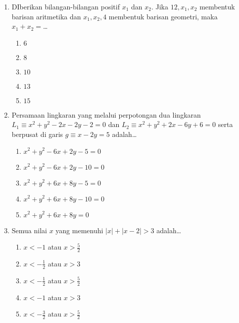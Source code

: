 \documentclass[A4,12PT, english, twocolumn]{journal}
\begin{document}
\begin{enumerate}
\item DIberikan bilangan-bilangan positif $x_1$ dan $x_2$. Jika $12, x_1, x_2$ membentuk barisan aritmetika dan $x_1, x_2, 4$ membentuk barisan geometri, maka $x_1 + x_2 =$\dots
	\begin{enumerate}
       \item $6$  
       \item $8$   
       \item $10$  
       \item $13$  
       \item $15$
	\end{enumerate}

\item Persamaan lingkaran yang melalui perpotongan dua lingkaran $L_1 \equiv x^2+y^2 - 2x - 2y - 2 = 0$ dan $L_2 \equiv x^2+y^2 + 2x - 6y +6 = 0$ serta berpusat di garis $g \equiv x - 2y = 5$ adalah\dots
	\begin{enumerate}
       \item $x^2 + y^2 - 6x + 2y - 5 = 0$
       \item $x^2 + y^2 - 6x + 2y - 10 = 0$ 
       \item $x^2 + y^2 + 6x + 8y - 5 = 0$
       \item $x^2 + y^2 + 6x + 8y - 10 = 0$ 
       \item $x^2 + y^2 + 6x + 8y  = 0$
	\end{enumerate}

\item Semua nilai $x$ yang memenuhi $|x|+|x-2| > 3$ adalah\dots
	\begin{enumerate}
       \item $x < -1$ atau $x > \frac{5}{2}$
       \item $x < -\frac{1}{2}$ atau $x > 3$
       \item $x < -\frac{1}{2}$ atau $x > \frac{5}{2}$
       \item $x < -1$ atau $ x > 3$
       \item $x < -\frac{3}{2}$ atau $x > \frac{5}{2}$
	\end{enumerate}


\end{enumerate}
\end{document}
